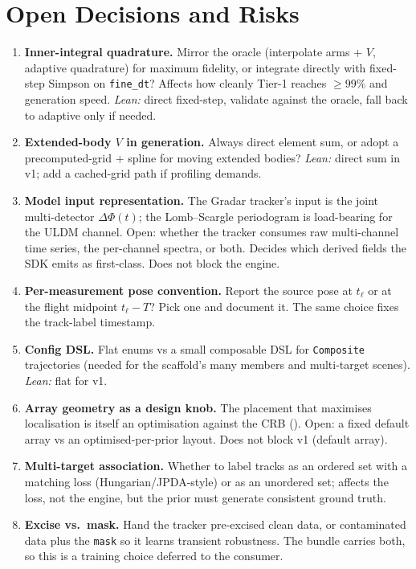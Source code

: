\documentclass[11pt,a4paper]{article}
\theoremstyle{reqstyle}
\begin{document}
\section{Open Decisions and Risks}
\label{sec:open}

\begin{enumerate}[leftmargin=*]
\item \textbf{Inner-integral quadrature.} Mirror the oracle (interpolate arms $+$ $V$,
adaptive quadrature) for maximum fidelity, or integrate directly with fixed-step Simpson on
\texttt{fine\_dt}? Affects how cleanly Tier-1 reaches $\geq 99\%$ and generation speed.
\emph{Lean:} direct fixed-step, validate against the oracle, fall back to adaptive only if
needed.
\item \textbf{Extended-body $V$ in generation.} Always direct element sum, or adopt a
precomputed-grid $+$ spline for moving extended bodies? \emph{Lean:} direct sum in v1; add a
cached-grid path if profiling demands.
\item \textbf{Model input representation.} The Gradar tracker's input is the joint
multi-detector $\Delta\Phi(t)$; the Lomb--Scargle periodogram is load-bearing for the ULDM
channel. Open: whether the tracker consumes raw multi-channel time series, the per-channel
spectra, or both. Decides which derived fields the SDK emits as first-class. Does not block the
engine.
\item \textbf{Per-measurement pose convention.} Report the source pose at $t_\ell$ or at the
flight midpoint $t_\ell - T$? Pick one and document it. The same choice fixes the track-label
timestamp.
\item \textbf{Config DSL.} Flat enums vs a small composable DSL for \texttt{Composite}
trajectories (needed for the scaffold's many members and multi-target scenes). \emph{Lean:}
flat for v1.
\item \textbf{Array geometry as a design knob.} The placement that maximises localisation is
itself an optimisation against the CRB (). Open: a fixed default array vs an
optimised-per-prior layout. Does not block v1 (default array).
\item \textbf{Multi-target association.} Whether to label tracks as an ordered set with a
matching loss (Hungarian/JPDA-style) or as an unordered set; affects the loss, not the engine,
but the prior must generate consistent ground truth.
\item \textbf{Excise vs.\ mask.} Hand the tracker pre-excised clean data, or contaminated data
plus the \texttt{mask} so it learns transient robustness. The bundle carries both, so this is a
training choice deferred to the consumer.
\end{enumerate}
\end{document}
